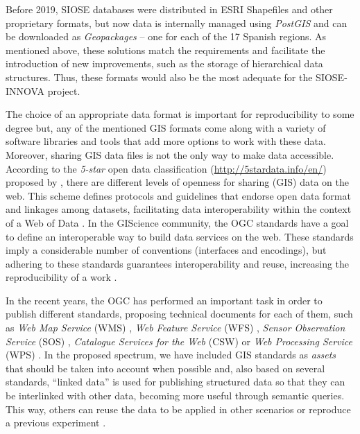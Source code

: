 \documentclass[ijgi,article,submit,moreauthors,pdftex]{Definitions/mdpi}
\begin{document}
Before 2019, SIOSE databases were distributed in ESRI Shapefiles and other proprietary formats, but now data is internally managed using \textit{PostGIS} and can be downloaded as \textit{Geopackages} -- one for each of the 17 Spanish regions. As mentioned above, these solutions match the requirements and facilitate the introduction of new improvements, such as the storage of hierarchical data structures. Thus, these formats would also be the most adequate for the SIOSE-INNOVA project.

The choice of an appropriate data format is important for reproducibility to some degree but, any of the mentioned GIS formats come along with a variety of software libraries and tools that add more options to work with these data. Moreover, sharing GIS data files is not the only way to make data accessible. According to the \textit{5-star} open data classification (\url{http://5stardata.info/en/}) proposed by \cite{berners2006linked}, there are different levels of openness for sharing (GIS) data on the web. This scheme defines protocols and guidelines that endorse open data format and linkages among datasets, facilitating data interoperability within the context of a Web of Data \cite{bizer2009dbpedia}. In the GIScience community, the OGC standards have a goal to define an interoperable way to build data services on the web. These standards imply a considerable number of conventions (interfaces and encodings), but adhering to these standards guarantees interoperability \cite{percivall2010progress} and reuse, increasing the reproducibility of a work \cite{giuliani2019earth}. 

In the recent years, the OGC has performed an important task in order to publish different standards, proposing technical documents for each of them, such as \textit{Web Map Service} (WMS) \cite{Beaujardiere}, \textit{Web Feature Service} (WFS) \cite{vretanos2005web}, \textit{Sensor Observation Service} (SOS) \cite{broring2010ogc}, \textit{Catalogue Services for the Web} (CSW) \cite{nebert04} or \textit{Web Processing Service} (WPS) \cite{schut2008}. In the proposed spectrum, we have included GIS standards as \textit{assets} that should be taken into account when possible and, also based on several standards, ``linked data'' is used for publishing structured data so that they can be interlinked with other data, becoming more useful through semantic queries. This way, others can reuse the data to be applied in other scenarios or reproduce a previous experiment \cite{benitez2018creating}.
\end{document}
